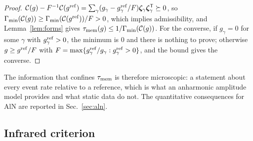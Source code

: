 \begin{proof}
$\mathcal C(g)-F^{-1}\mathcal C(g^{\rm ref})=\sum_\gamma(g_\gamma-g^{\rm ref}_\gamma/F)\bm\zeta_\gamma\bm\zeta_\gamma^{\mathsf T}\succeq0$,
so $\Gamma_{\min}(\mathcal C(g))\ge\Gamma_{\min}(\mathcal C(g^{\rm ref}))/F>0$, which implies admissibility, and
Lemma~\ref{lem:forms} gives $\tau_{\rm mem}(g)\le1/\Gamma_{\min}(\mathcal C(g))$. For the converse, if $g_\gamma=0$ for
some $\gamma$ with $g^{\rm ref}_\gamma>0$, the minimum is $0$ and there is nothing to prove; otherwise
$g\ge g^{\rm ref}/F$ with $F=\max\{g^{\rm ref}_\gamma/g_\gamma:g^{\rm ref}_\gamma>0\}$, and the bound gives
the converse.
\end{proof}

The information that confines $\tau_{\rm mem}$ is therefore microscopic: a statement about every event rate
relative to a reference, which is what an anharmonic amplitude model provides and what static data do
not. The quantitative consequences for AlN are reported in Sec.~\ref{sec:aln}.

\subsection{Infrared criterion}\label{sec:ir}

